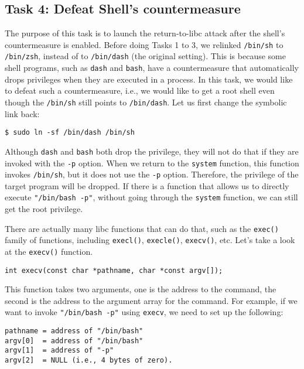 \subsection{Task 4: Defeat Shell's countermeasure}

The purpose of this task is to launch the return-to-libc attack after 
the shell's countermeasure is enabled. 
Before doing Tasks 1 to 3, we relinked \texttt{/bin/sh} to \texttt{/bin/zsh},
instead of to \texttt{/bin/dash} (the original setting). This is because some shell programs, such 
as \texttt{dash} and \texttt{bash}, have a countermeasure that automatically 
drops privileges when they are executed in a \setuid process. In this task, we 
would like to defeat such a countermeasure, i.e., we would like to get a root shell even though
the \texttt{/bin/sh} still points to \texttt{/bin/dash}.   
Let us first change the symbolic link back:

\begin{lstlisting}
$ sudo ln -sf /bin/dash /bin/sh
\end{lstlisting}

Although \texttt{dash} and \texttt{bash} both drop the \setuid privilege,
they will not do that if they are invoked with the \texttt{-p} option. When
we return to the \texttt{system} function, this function invokes \texttt{/bin/sh}, 
but it does not use the \texttt{-p} option. Therefore, the \setuid
privilege of the target program will be dropped. If there is a function
that allows us to directly execute \texttt{"/bin/bash -p"}, without going
through the \texttt{system} function, we can still get the root privilege. 

There are actually many libc functions that can do that, such as 
the \texttt{exec()} family  of functions, including \texttt{execl()},
\texttt{execle()}, \texttt{execv()}, etc. Let's take a look at the
\texttt{execv()} function.

\begin{lstlisting}
int execv(const char *pathname, char *const argv[]);
\end{lstlisting}
 
This function takes two arguments, one is the address to the command, the 
second is the address to the argument array for the command. For example, if we 
want to invoke \texttt{"/bin/bash -p"} using \texttt{execv}, we need to 
set up the following:

\begin{lstlisting}
pathname = address of "/bin/bash" 
argv[0]  = address of "/bin/bash"
argv[1]  = address of "-p"
argv[2]  = NULL (i.e., 4 bytes of zero).
\end{lstlisting}
 
